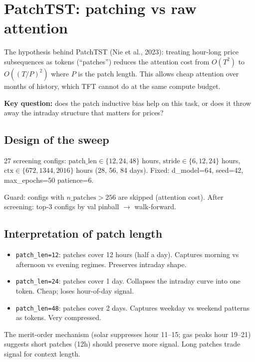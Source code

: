 \section{PatchTST: patching vs raw attention}

The hypothesis behind PatchTST (Nie et al., 2023): treating hour-long
price subsequences as tokens (``patches'') reduces the attention cost from
$O(T^2)$ to $O((T/P)^2)$ where $P$ is the patch length. This allows
cheap attention over months of history, which TFT cannot do at the same
compute budget.

\textbf{Key question:} does the patch inductive bias help on this task,
or does it throw away the intraday structure that matters for prices?

\subsection{Design of the sweep}

27 screening configs: $\text{patch\_len} \in \{12, 24, 48\}$ hours,
$\text{stride} \in \{6, 12, 24\}$ hours, $\text{ctx} \in \{672, 1344, 2016\}$
hours (28, 56, 84 days). Fixed: d\_model=64, seed=42, max\_epochs=50 patience=6.

Guard: configs with $n\_\text{patches} > 256$ are skipped (attention cost).
After screening: top-3 configs by val pinball $\to$ walk-forward.

\subsection{Interpretation of patch length}

\begin{itemize}
  \item \texttt{patch\_len=12}: patches cover 12 hours (half a day). Captures
        morning vs afternoon vs evening regimes. Preserves intraday shape.
  \item \texttt{patch\_len=24}: patches cover 1 day. Collapses the intraday
        curve into one token. Cheap; loses hour-of-day signal.
  \item \texttt{patch\_len=48}: patches cover 2 days. Captures weekday
        vs weekend patterns as tokens. Very compressed.
\end{itemize}

The merit-order mechanism (solar suppresses hour 11--15; gas peaks hour 19--21)
suggests short patches (12h) should preserve more signal. Long patches trade
signal for context length.

